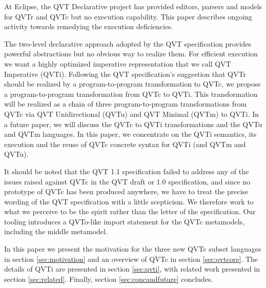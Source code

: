 At Eclipse, the QVT Declarative project has provided editors, parsers and models for QVTr and QVTc but no execution capability. This paper describes ongoing activity towards remedying the execution deficiencies.

The two-level declarative approach adopted by the QVT specification provides powerful abstractions but no obvious way to realize them. For efficient execution we want a highly optimized imperative representation that we call QVT Imperative (QVTi). Following the QVT specification's suggestion that QVTr should be realized by a program-to-program transformation to QVTc, we propose a program-to-program transformation from QVTc to QVTi. This transformation will be realized as a chain of three program-to-program transformations from QVTc via QVT Unidirectional (QVTu) and QVT Minimal (QVTm) to QVTi. In a future paper, we will discuss the QVTc to QVTi transformations and the QVTu and QVTm languages. In this paper, we concentrate on the QVTi semantics, its execution and the reuse of QVTc concrete syntax for QVTi (and QVTm and QVTu).

It should be noted that the QVT 1.1 specification failed to address any of the issues raised against QVTc in the QVT draft or 1.0 specification, and since no prototype of QVTc has been produced anywhere, we have to treat the precise wording of the QVT specification with a little scepticism. We therefore work to what we perceive to be the spirit rather than the letter of the specification. Our tooling introduces a QVTo-like import statement for the QVTc  metamodels, including the middle metamodel.

In this paper we present the motivation for the three new QVTc subset languages in section \ref{sec:motivation} and an overview of QVTc in section \ref{sec:qvtcore}. The details of QVTi are presented in section \ref{sec:qvti}, with related work presented in section \ref{sec:related}. Finally, section \ref{sec:concandfuture} concludes.